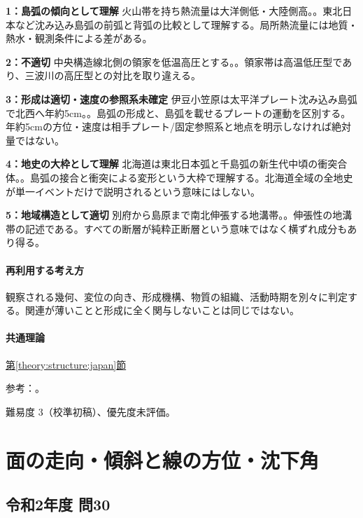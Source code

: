 \noindent\textbf{1：島弧の傾向として理解} 火山帯を持ち熱流量は大洋側低・大陸側高。。東北日本など沈み込み島弧の前弧と背弧の比較として理解する。局所熱流量には地質・熱水・観測条件による差がある。\par

\noindent\textbf{2：不適切} 中央構造線北側の領家を低温高圧とする。。領家帯は高温低圧型であり、三波川の高圧型との対比を取り違える。\par

\noindent\textbf{3：形成は適切・速度の参照系未確定} 伊豆小笠原は太平洋プレート沈み込み島弧で北西へ年約5cm。。島弧の形成と、島弧を載せるプレートの運動を区別する。年約5cmの方位・速度は相手プレート/固定参照系と地点を明示しなければ絶対量ではない。\par

\noindent\textbf{4：地史の大枠として理解} 北海道は東北日本弧と千島弧の新生代中頃の衝突合体。。島弧の接合と衝突による変形という大枠で理解する。北海道全域の全地史が単一イベントだけで説明されるという意味にはしない。\par

\noindent\textbf{5：地域構造として適切} 別府から島原まで南北伸張する地溝帯。。伸張性の地溝帯の記述である。すべての断層が純粋正断層という意味ではなく横ずれ成分もあり得る。\par

\paragraph{再利用する考え方} 観察される幾何、変位の向き、形成機構、物質の組織、活動時期を別々に判定する。関連が薄いことと形成に全く関与しないことは同じではない。

\paragraph{共通理論} \hyperref[theory:structure:japan]{第\ref*{theory:structure:japan}節}

\par 参考：\cite{str_ryoke}。

\par 難易度 3（校準初稿）、優先度未評価。

\section{面の走向・傾斜と線の方位・沈下角}

\subsection{令和2年度 問30}
\label{q:r02-reg-applied-30}

